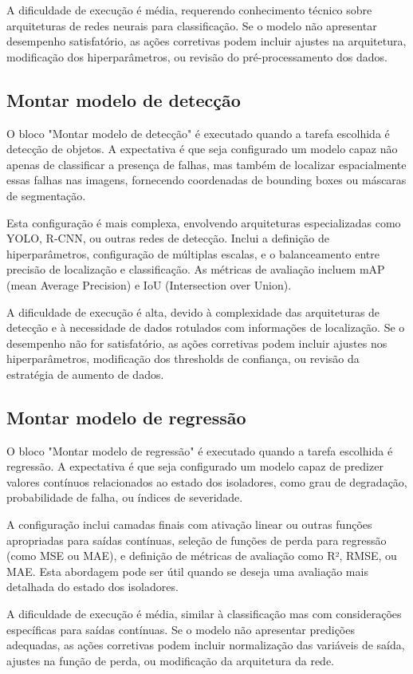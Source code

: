 A dificuldade de execução é média, requerendo conhecimento técnico sobre arquiteturas de redes neurais para classificação. Se o modelo não apresentar desempenho satisfatório, as ações corretivas podem incluir ajustes na arquitetura, modificação dos hiperparâmetros, ou revisão do pré-processamento dos dados.

\subsection{Montar modelo de detecção}
O bloco "Montar modelo de detecção" é executado quando a tarefa escolhida é detecção de objetos. A expectativa é que seja configurado um modelo capaz não apenas de classificar a presença de falhas, mas também de localizar espacialmente essas falhas nas imagens, fornecendo coordenadas de bounding boxes ou máscaras de segmentação.

Esta configuração é mais complexa, envolvendo arquiteturas especializadas como YOLO, R-CNN, ou outras redes de detecção. Inclui a definição de hiperparâmetros, configuração de múltiplas escalas, e o balanceamento entre precisão de localização e classificação. As métricas de avaliação incluem mAP (mean Average Precision) e IoU (Intersection over Union).

A dificuldade de execução é alta, devido à complexidade das arquiteturas de detecção e à necessidade de dados rotulados com informações de localização. Se o desempenho não for satisfatório, as ações corretivas podem incluir ajustes nos hiperparâmetros, modificação dos thresholds de confiança, ou revisão da estratégia de aumento de dados.

\subsection{Montar modelo de regressão}
O bloco "Montar modelo de regressão" é executado quando a tarefa escolhida é regressão. A expectativa é que seja configurado um modelo capaz de predizer valores contínuos relacionados ao estado dos isoladores, como grau de degradação, probabilidade de falha, ou índices de severidade.

A configuração inclui camadas finais com ativação linear ou outras funções apropriadas para saídas contínuas, seleção de funções de perda para regressão (como MSE ou MAE), e definição de métricas de avaliação como R², RMSE, ou MAE. Esta abordagem pode ser útil quando se deseja uma avaliação mais detalhada do estado dos isoladores.

A dificuldade de execução é média, similar à classificação mas com considerações específicas para saídas contínuas. Se o modelo não apresentar predições adequadas, as ações corretivas podem incluir normalização das variáveis de saída, ajustes na função de perda, ou modificação da arquitetura da rede.

